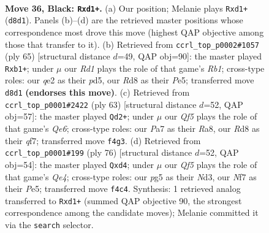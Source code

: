 \documentclass[11pt]{article}
\begin{document}
\clearpage

\begin{figure}[p]\centering
\begin{subfigure}{0.46\textwidth}\centering
\resizebox{\linewidth}{!}{%
\newchessgame
\chessboard[
  setfen={2kr4/p1p2npp/1p2p3/2p3P1/5q2/2P4P/1P2Q3/1K1R4 b - - 1 36},
  showmover=false,
  pgfstyle=straightmove, color=movearrow, markmove={d8-d1}
]}
\caption{}
\end{subfigure}\hfill
\begin{subfigure}{0.46\textwidth}\centering
\resizebox{\linewidth}{!}{%
\newchessgame
\chessboard[
  setfen={1r4k1/5p1p/6pP/P2Pp3/q1p2PP1/P3Q3/8/1RK5 b - - 4 33},
  showmover=false,
  pgfstyle=straightmove, color=movearrow, markmove={b8-b1}
]}
\caption{}
\end{subfigure}
\\[4pt]
\begin{subfigure}{0.46\textwidth}\centering
\resizebox{\linewidth}{!}{%
\newchessgame
\chessboard[
  setfen={r6k/pp3Qp1/2pp4/4pR2/4P2P/2PPq3/PP5K/8 b - - 5 32},
  showmover=false,
  pgfstyle=straightmove, color=movearrow, markmove={e3-d2}
]}
\caption{}
\end{subfigure}\hfill
\begin{subfigure}{0.46\textwidth}\centering
\resizebox{\linewidth}{!}{%
\newchessgame
\chessboard[
  setfen={1r3nk1/p5p1/4p2p/4P3/2PpQ3/q2N2P1/P6P/5RK1 w - - 2 39},
  showmover=false,
  pgfstyle=straightmove, color=movearrow, markmove={e4-d4}
]}
\caption{}
\end{subfigure}
\caption{\textbf{Move 36, Black: \texttt{Rxd1+}.} (a) Our position; Melanie plays \texttt{Rxd1+} (\texttt{d8d1}). Panels (b)--(d) are the retrieved master positions whose correspondence most drove this move (highest QAP objective among those that transfer to it). (b) Retrieved from \texttt{ccrl\_top\_p0002\#1057} (ply 65) [structural distance $d$=49, QAP obj=90]: the master played \texttt{Rxb1+}; under $\mu$ our \emph{Rd1} plays the role of that game's \emph{Rb1}; cross-type roles: our \emph{q}e2 as their \emph{p}d5, our \emph{R}d8 as their \emph{P}e5; transferred move \texttt{d8d1} \textbf{(endorses this move)}. (c) Retrieved from \texttt{ccrl\_top\_p0001\#2422} (ply 63) [structural distance $d$=52, QAP obj=57]: the master played \texttt{Qd2+}; under $\mu$ our \emph{Qf5} plays the role of that game's \emph{Qe6}; cross-type roles: our \emph{P}a7 as their \emph{R}a8, our \emph{R}d8 as their \emph{q}f7; transferred move \texttt{f4g3}. (d) Retrieved from \texttt{ccrl\_top\_p0001\#199} (ply 76) [structural distance $d$=52, QAP obj=54]: the master played \texttt{Qxd4}; under $\mu$ our \emph{Qf5} plays the role of that game's \emph{Qe4}; cross-type roles: our \emph{p}g5 as their \emph{N}d3, our \emph{N}f7 as their \emph{P}e5; transferred move \texttt{f4c4}. Synthesis: 1 retrieved analog transferred to \texttt{Rxd1+} (summed QAP objective 90, the strongest correspondence among the candidate moves); Melanie committed it via the \texttt{search} selector.}
\label{fig:thought-m71}
\end{figure}
\end{document}
